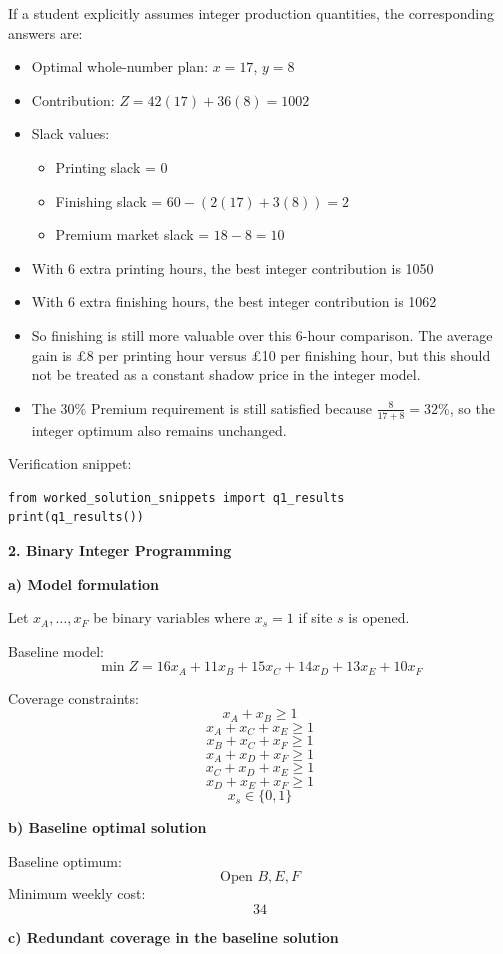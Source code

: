 \documentclass[11pt,a4paper]{article}
\begin{document}
If a student explicitly assumes integer production quantities, the corresponding answers are:
\begin{itemize}
\item Optimal whole-number plan: $x = 17$, $y = 8$
\item Contribution: $Z = 42(17) + 36(8) = 1002$
\item Slack values:
\begin{itemize}
\item Printing slack = 0
\item Finishing slack = $60 - (2(17) + 3(8)) = 2$
\item Premium market slack = $18 - 8 = 10$
\end{itemize}
\item With 6 extra printing hours, the best integer contribution is 1050
\item With 6 extra finishing hours, the best integer contribution is 1062
\item So finishing is still more valuable over this 6-hour comparison. The average gain is \pounds 8 per printing hour versus \pounds 10 per finishing hour, but this should not be treated as a constant shadow price in the integer model.
\item The 30\% Premium requirement is still satisfied because $\frac{8}{17+8} = 32\%$, so the integer optimum also remains unchanged.
\end{itemize}

Verification snippet:
\begin{verbatim}
from worked_solution_snippets import q1_results
print(q1_results())
\end{verbatim}

\textbf{2. Binary Integer Programming}

\textbf{a) Model formulation}

Let $x_A, \ldots, x_F$ be binary variables where $x_s = 1$ if site $s$ is opened.

Baseline model:
\[
\min Z = 16x_A + 11x_B + 15x_C + 14x_D + 13x_E + 10x_F
\]

Coverage constraints:
\[
x_A + x_B \ge 1
\]
\[
x_A + x_C + x_E \ge 1
\]
\[
x_B + x_C + x_F \ge 1
\]
\[
x_A + x_D + x_F \ge 1
\]
\[
x_C + x_D + x_E \ge 1
\]
\[
x_D + x_E + x_F \ge 1
\]
\[
x_s \in \{0,1\}
\]

\textbf{b) Baseline optimal solution}

Baseline optimum:
\[
\text{Open } B, E, F
\]
Minimum weekly cost:
\[
34
\]

\textbf{c) Redundant coverage in the baseline solution}
\end{document}
